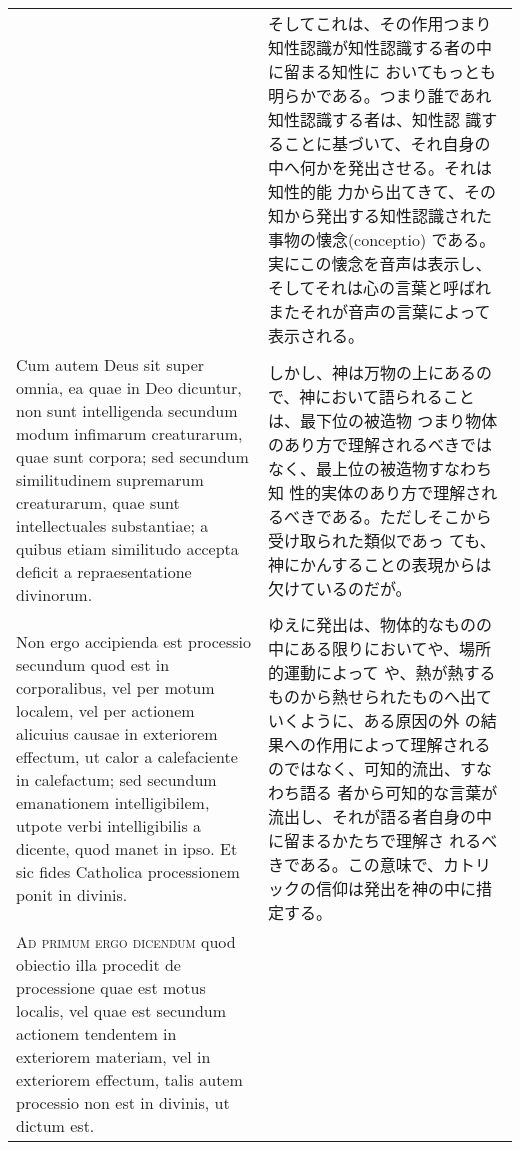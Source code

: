\documentclass[10pt]{jsarticle} %
\begin{document}
\begin{longtable}{p{21em}p{21em}}
&


そしてこれは、その作用つまり知性認識が知性認識する者の中に留まる知性に
 おいてもっとも明らかである。つまり誰であれ知性認識する者は、知性認
 識することに基づいて、それ自身の中へ何かを発出させる。それは知性的能
 力から出てきて、その知から発出する知性認識された事物の懐念(conceptio)
 である。実にこの懐念を音声は表示し、そしてそれは心の言葉と呼ばれ
またそれが音声の言葉によって表示される。


\\


Cum autem Deus sit super omnia, ea quae in Deo dicuntur,
non sunt intelligenda secundum modum infimarum creaturarum, quae sunt
corpora; sed secundum similitudinem supremarum creaturarum, quae sunt
intellectuales substantiae; a quibus etiam similitudo accepta deficit a
repraesentatione divinorum. 



&

しかし、神は万物の上にあるので、神において語られることは、最下位の被造物
つまり物体のあり方で理解されるべきではなく、最上位の被造物すなわち知
 性的実体のあり方で理解されるべきである。ただしそこから受け取られた類似であっ
 ても、神にかんすることの表現からは欠けているのだが。

\\



Non ergo accipienda est processio secundum
quod est in corporalibus, vel per motum localem, vel per actionem
alicuius causae in exteriorem effectum, ut calor a calefaciente in
calefactum; sed secundum emanationem intelligibilem, utpote verbi
intelligibilis a dicente, quod manet in ipso. Et sic fides Catholica
processionem ponit in divinis.


&

ゆえに発出は、物体的なものの中にある限りにおいてや、場所的運動によって
 や、熱が熱するものから熱せられたものへ出ていくように、ある原因の外
 の結果への作用によって理解されるのではなく、可知的流出、すなわち語る
 者から可知的な言葉が流出し、それが語る者自身の中に留まるかたちで理解さ
 れるべきである。この意味で、カトリックの信仰は発出を神の中に措定する。


\\



{\scshape Ad primum ergo dicendum} quod obiectio illa procedit de processione quae
est motus localis, vel quae est secundum actionem tendentem in
exteriorem materiam, vel in exteriorem effectum, talis autem processio
non est in divinis, ut dictum est.



\end{longtable}
\end{document}
